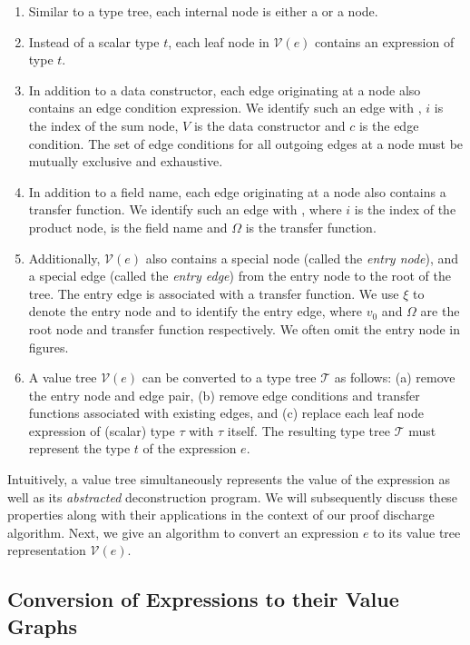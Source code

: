 \begin{enumerate}
\item Similar to a type tree, each internal node is either a \sumn{} or a \prodn{} node.
\item Instead of a scalar type $t$, each leaf node in $\mathcal{V}(e)$ contains an expression
of type $t$.
\item In addition to a data constructor, each edge originating at a \sumn{} node also contains
an edge condition expression. We identify such an edge with , $i$ is the index of
the sum node, $V$ is the data constructor and $c$ is the edge condition.
The set of edge conditions for all outgoing edges at a \sumn{} node must be mutually exclusive and exhaustive.
\item In addition to a field name, each edge originating at a \prodn{} node also contains
a transfer function. We identify such an edge with , where $i$ is the index of
the product node,  is the field name and $\Omega$ is the transfer function.
\item Additionally, $\mathcal{V}(e)$ also contains a special node (called the {\em entry node}), and a special edge
(called the {\em entry edge}) from the entry node to the root of the tree.
The entry edge is associated with a transfer function.
We use $\xi$ to denote the entry node and  to identify the entry edge,
where $v_0$ and $\Omega$ are the root node and transfer function respectively.
We often omit the entry node in figures.
\item A value tree $\mathcal{V}(e)$ can be converted to a type tree $\mathcal{T}$ as follows:
(a) remove the entry node and edge pair, (b) remove edge conditions and transfer functions
associated with existing edges, and (c) replace each leaf node expression of (scalar) type $\tau$
with $\tau$ itself.
The resulting type tree $\mathcal{T}$ must represent the type $t$ of the expression $e$.
\end{enumerate}

Intuitively, a value tree simultaneously represents the value of the expression as well as its
{\em abstracted} deconstruction program.
We will subsequently discuss these properties along with their applications in the context
of our proof discharge algorithm.
Next, we give an algorithm to convert an expression $e$ to its value tree representation $\mathcal{V}(e)$.

\subsection{Conversion of Expressions to their Value Graphs}

